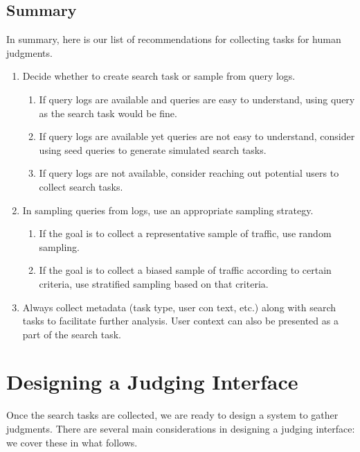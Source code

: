 
\subsection{Summary}
In summary, here is our list of recommendations for collecting tasks for human judgments.

\begin{enumerate}
	\item Decide whether to create search task or sample from query logs. 
	\begin{enumerate}
		\item If query logs are available and queries are easy to understand, using query as the search task would be fine. 
		\item If query logs are available yet queries are not easy to understand, consider using seed queries to generate simulated search tasks.
		\item If query logs are not available, consider reaching out potential users to collect search tasks.
	\end{enumerate}
	\item In sampling queries from logs, use an appropriate sampling strategy. 
	\begin{enumerate}
		\item If the goal is to collect a representative sample of traffic, use random sampling.
		\item If the goal is to collect a biased sample of traffic according to certain criteria, use stratified sampling based on that criteria.
	\end{enumerate}
	\item Always collect metadata (task type, user con text, etc.) along with search tasks to facilitate further analysis. User context can also be presented as a part of the search task.
\end{enumerate}

\section{Designing a Judging Interface}

Once the search tasks are collected, we are ready to design a system to gather judgments. There are several main considerations in designing a judging interface: we cover these in what follows.

